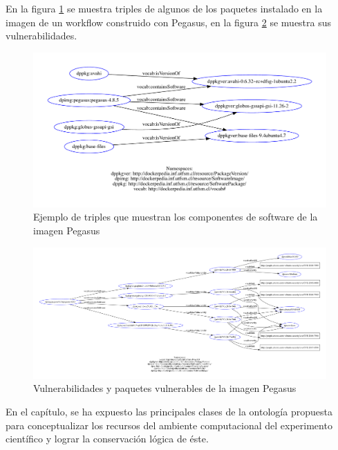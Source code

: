 En la figura  \ref{fig:packages-pegasus} se muestra triples de algunos de los paquetes instalado en la imagen de un workflow construido con Pegasus, en la figura \ref{fig:vulnerability-pegasus} se muestra sus vulnerabilidades.
\begin{figure}[t]
    \hspace*{-4cm}   
    \includegraphics[width=1.3\textwidth]{Figures/packages}
     \caption[Paquetes de la imagen Pegasus]{Ejemplo de triples que muestran los componentes de software de la imagen Pegasus}
    \label{fig:packages-pegasus}
      
\end{figure}

\begin{figure}[t]
    \hspace*{-4cm}   
    \includegraphics[width=1.3\textwidth]{Figures/packages-vuln}
      \caption[Paquetes y vulnerabilidades de la imagen Pegasus]{Vulnerabilidades y paquetes vulnerables de la imagen Pegasus}
    \label{fig:vulnerability-pegasus}
\end{figure}

En el capítulo, se ha expuesto las principales clases de la ontología propuesta para conceptualizar los recursos del ambiente computacional del experimento científico y lograr la conservación lógica de éste.


